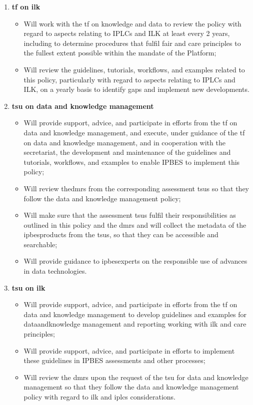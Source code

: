 \documentclass{article}
\begin{document}
\begin{enumerate}[label=(\alph*)]
    \item \textbf{\gls{tf} on \gls{ilk}}
    \begin{itemize}
        \item Will work with the \gls{tf} on knowledge and data to review the policy with regard to aspects relating to IPLCs and ILK at least every 2 years, including to determine procedures that fulfil \gls{fair} and \gls{care} principles to the fullest extent possible within the mandate of the Platform;
        \item Will review the guidelines, tutorials, \glspl{workflow}, and examples related to this policy, particularly with regard to aspects relating to IPLCs and ILK, on a yearly basis to identify gaps and implement new developments.
    \end{itemize}

    \item \textbf{\gls{tsu} on data and knowledge management}
    \begin{itemize}
        \item Will provide support, advice, and participate in efforts from the \gls{tf} on data and knowledge management, and execute, under guidance of the \gls{tf} on data and knowledge management, and in cooperation with the \gls{secretariat}, the development and maintenance of the guidelines and tutorials, \glspl{workflow}, and examples to enable IPBES to implement this policy;
        \item Will review the\glspl{dmr} from the corresponding assessment \glspl{tsu} so that they follow the data and knowledge management policy;
        \item Will make sure that the assessment \glspl{tsu} fulfil their responsibilities as outlined in this policy and the \glspl{dmr} and will collect the metadata of the \glspl{ipbesproduct} from the \glspl{tsu}, so that they can be \gls{accessible} and searchable;
        \item Will provide guidance to \glspl{ipbesexpert} on the responsible use of advances in \gls{data} technologies.
    \end{itemize}

    \item \textbf{\gls{tsu} on \gls{ilk}}
    \begin{itemize}
        \item Will provide support, advice, and participate in efforts from the \gls{tf} on data and knowledge management to develop guidelines and examples for \gls{dataandknowledge} management and reporting working with \gls{ilk} and \gls{care} principles;
        \item Will provide support, advice, and participate in efforts to implement these guidelines in IPBES assessments and other processes;
        \item Will review the \glspl{dmr} upon the request of the \gls{tsu} for data and knowledge management so that they follow the data and knowledge management policy with regard to \gls{ilk} and \glspl{iplc} considerations.
    \end{itemize}


\end{enumerate}
\end{document}
